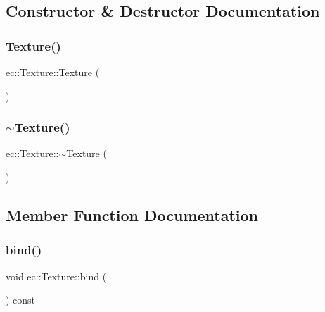 \subsection{Constructor \& Destructor Documentation}
\mbox{\label{classec_1_1_texture_ac2551ef676d0c771f35dc470b8a0b237}} 
\subsubsection{\texorpdfstring{Texture()}{Texture()}}
{\footnotesize\ttfamily ec\+::\+Texture\+::\+Texture (\begin{DoxyParamCaption}{ }\end{DoxyParamCaption})\hspace{0.3cm}{\ttfamily [explicit]}}

\mbox{\label{classec_1_1_texture_ae567d80654dd09c6b02a38ca8de29ead}} 
\subsubsection{\texorpdfstring{$\sim$\+Texture()}{~Texture()}}
{\footnotesize\ttfamily ec\+::\+Texture\+::$\sim$\+Texture (\begin{DoxyParamCaption}{ }\end{DoxyParamCaption})\hspace{0.3cm}{\ttfamily [default]}}



\subsection{Member Function Documentation}
\mbox{\label{classec_1_1_texture_a9e2f0191cfcc85c87edb821508cc06ee}} 
\subsubsection{\texorpdfstring{bind()}{bind()}}
{\footnotesize\ttfamily void ec\+::\+Texture\+::bind (\begin{DoxyParamCaption}{ }\end{DoxyParamCaption}) const}

